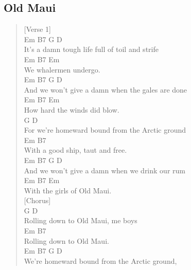 \documentclass[11pt]{article}
\begin{document}
\subsection{Old Maui}
\label{sec:orga159045}
\begin{verse}
[Verse 1]\\
\hspace*{7em}Em         B7           G        D\\
It's a damn tough life full of toil and strife\\
\hspace*{3em}Em        B7   Em\\
We whalermen undergo.\\
\hspace*{7em}Em           B7            G      D\\
And we won't give a damn when the gales are done\\
\hspace*{4em}Em       B7        Em\\
How hard the winds did blow.\\
\hspace*{10em}G                       D\\
For we're homeward bound from the Arctic ground\\
\hspace*{7em}Em                  B7\\
With a good ship, taut and free.\\
\hspace*{7em}Em           B7           G         D\\
And we won't give a damn when we drink our rum\\
\hspace*{9em}Em       B7    Em\\
With the girls of Old Maui.\\
\vspace*{1em}
[Chorus]\\
\hspace*{8em}G             D\\
Rolling down to Old Maui, me boys\\
\hspace*{8em}Em            B7\\
Rolling down to Old Maui.\\
\hspace*{6em}Em       B7             G      D\\
We're homeward bound from the Arctic ground,\\

\end{verse}
\end{document}

